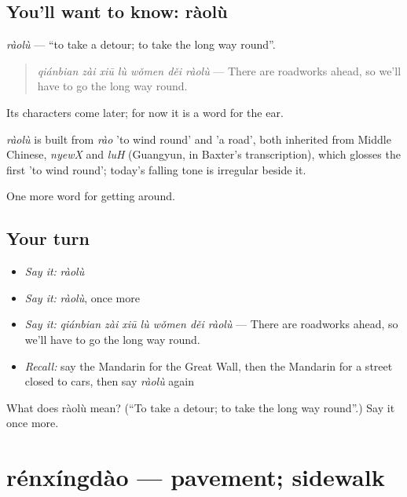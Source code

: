 \subsection*{You'll want to know: ràolù}
\emph{ràolù} — \textquotedblleft{}to take a detour; to take the long way round\textquotedblright{}.

\begin{quote}
\emph{qiánbian zài xiū lù wǒmen děi ràolù} — There are roadworks ahead, so we'll have to go the long way round.
\end{quote}

Its characters come later; for now it is a word for the ear.

\begin{cousinweb}
\emph{ràolù} is built from \emph{rào} 'to wind round' and  'a road', both inherited from Middle Chinese, \emph{nyewX} and \emph{luH} (Guangyun, in Baxter's transcription), which glosses the first 'to wind round'; today's falling tone is irregular beside it.
\end{cousinweb}

\begin{grammarlens}[title={What you've built}]
One more word for getting around.
\end{grammarlens}

\subsection*{Your turn}
\begin{itemize}
\raggedright
  \item \emph{Say it:} \emph{ràolù}
  \item \emph{Say it:} \emph{ràolù}, once more
  \item \emph{Say it:} \emph{qiánbian zài xiū lù wǒmen děi ràolù} — There are roadworks ahead, so we'll have to go the long way round.
  \item \emph{Recall:} say the Mandarin for the Great Wall, then the Mandarin for a street closed to cars, then say \emph{ràolù} again
\end{itemize}

\begin{tcolorbox}[breakable,colback=teal!4,colframe=teal!35!black,title={Before you move on}]
What does ràolù mean? (\textquotedblleft{}To take a detour; to take the long way round\textquotedblright{}.) Say it once more.
\end{tcolorbox}
\section[rénxíngdào]{rénxíngdào — pavement; sidewalk}

